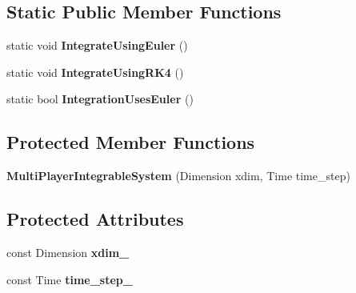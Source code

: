 \subsection*{Static Public Member Functions}
\begin{DoxyCompactItemize}
\item 
static void {\bfseries Integrate\+Using\+Euler} ()\hypertarget{classilqgames_1_1_multi_player_integrable_system_afbe59f8e51163913a0ef03b84bf6b33b}{}\label{classilqgames_1_1_multi_player_integrable_system_afbe59f8e51163913a0ef03b84bf6b33b}

\item 
static void {\bfseries Integrate\+Using\+R\+K4} ()\hypertarget{classilqgames_1_1_multi_player_integrable_system_a8623ddb41f2ea72b1838d5f8292fe091}{}\label{classilqgames_1_1_multi_player_integrable_system_a8623ddb41f2ea72b1838d5f8292fe091}

\item 
static bool {\bfseries Integration\+Uses\+Euler} ()\hypertarget{classilqgames_1_1_multi_player_integrable_system_a7d8d977e079520ad4eb6e2e38833b25c}{}\label{classilqgames_1_1_multi_player_integrable_system_a7d8d977e079520ad4eb6e2e38833b25c}

\end{DoxyCompactItemize}
\subsection*{Protected Member Functions}
\begin{DoxyCompactItemize}
\item 
{\bfseries Multi\+Player\+Integrable\+System} (Dimension xdim, Time time\+\_\+step)\hypertarget{classilqgames_1_1_multi_player_integrable_system_a7b66a8aa057ed007006d884b5fe333af}{}\label{classilqgames_1_1_multi_player_integrable_system_a7b66a8aa057ed007006d884b5fe333af}

\end{DoxyCompactItemize}
\subsection*{Protected Attributes}
\begin{DoxyCompactItemize}
\item 
const Dimension {\bfseries xdim\+\_\+}\hypertarget{classilqgames_1_1_multi_player_integrable_system_ad6f5958f0f51492aa1d368765f417a19}{}\label{classilqgames_1_1_multi_player_integrable_system_ad6f5958f0f51492aa1d368765f417a19}

\item 
const Time {\bfseries time\+\_\+step\+\_\+}\hypertarget{classilqgames_1_1_multi_player_integrable_system_adbd2c27a82e441fab50201f583a869f2}{}\label{classilqgames_1_1_multi_player_integrable_system_adbd2c27a82e441fab50201f583a869f2}

\end{DoxyCompactItemize}
